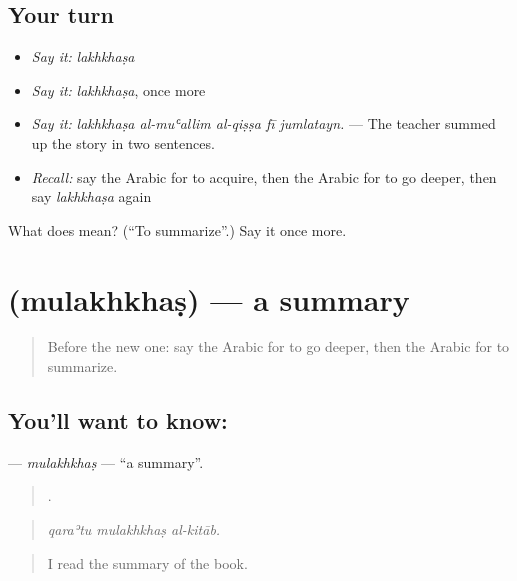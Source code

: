 \subsection*{Your turn}
\begin{itemize}
\raggedright
  \item \emph{Say it:} \emph{lakhkhaṣa}
  \item \emph{Say it:} \emph{lakhkhaṣa}, once more
  \item \emph{Say it:} \emph{lakhkhaṣa al-muʿallim al-qiṣṣa fī jumlatayn.} — The teacher summed up the story in two sentences.
  \item \emph{Recall:} say the Arabic for to acquire, then the Arabic for to go deeper, then say \emph{lakhkhaṣa} again
\end{itemize}

\begin{tcolorbox}[breakable,colback=teal!4,colframe=teal!35!black,title={Before you move on}]
What does  mean? (\textquotedblleft{}To summarize\textquotedblright{}.) Say it once more.
\end{tcolorbox}
\section[\texorpdfstring{\ar{ملخص} (mulakhkhaṣ)}{ملخص (mulakhkhaṣ)}]{ (mulakhkhaṣ) — a summary}

\label{lesson:AR-C394-mulakhkhas}



\begin{quote}
Before the new one: say the Arabic for to go deeper, then the Arabic for to summarize.
\end{quote}

\subsection*{You'll want to know: }
\textbf{} — \emph{mulakhkhaṣ} — \textquotedblleft{}a summary\textquotedblright{}.

\begin{quote}
  .
\end{quote}

\begin{quote}
\emph{qaraʾtu mulakhkhaṣ al-kitāb.}
\end{quote}

\begin{quote}
I read the summary of the book.
\end{quote}

